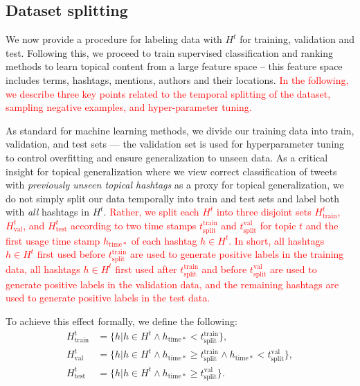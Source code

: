 \subsection*{Dataset splitting}


We now provide a procedure for labeling data with $H^t$ for training, validation and test.
Following this, we proceed to train supervised classification and ranking methods to learn topical content from a large feature space -- this feature space includes terms, hashtags, mentions, authors and their locations. \textcolor{red}{ In the following, we describe three key points related to the temporal splitting of the dataset, sampling negative examples, and hyper-parameter tuning.}


As standard for machine learning methods, we divide our training data into
train, validation, and test sets --- the validation set is used for hyperparameter tuning to control
overfitting and ensure generalization to unseen data.  
As a critical insight for topical generalization where we view correct classification 
of tweets with \emph{previously unseen topical hashtags} as a proxy for topical generalization, 
we do not simply
split our data temporally into train and test sets and label both with \emph{all} 
hashtags in $H^t$. \textcolor{red}{ Rather,
we split each $H^t$ into three disjoint sets $H^t_\mathrm{train}$, $H^t_\mathrm{val}$, and $H^t_\mathrm{test}$
according to two time stamps $t^\mathrm{train}_\mathrm{split}$ and $t^\mathrm{val}_\mathrm{split}$ for topic $t$ and the first usage time stamp 
$h_\mathrm{time*}$ of each hashtag $h \in H^t$.  In short, all hashtags $h \in H^t$ first used
before $t^\mathrm{train}_\mathrm{split}$ are used to generate positive labels in the training data, all hashtags $h \in H^t$ first used
after $t^\mathrm{train}_\mathrm{split}$ and before $t^\mathrm{val}_\mathrm{split}$ 
are used to generate positive labels in the validation data,  and
the remaining hashtags are used to generate positive labels in the test data.}

\noindent To achieve this effect formally, we define the following:
\begin{align*}
H^t_\mathrm{train} & = \{ h | h \in H^t \land h_\mathrm{time*} <    t^\mathrm{train}_\mathrm{split} \} ,  \\
H^t_\mathrm{val}   & = \{ h | h \in H^t \land h_\mathrm{time*} \geq t^\mathrm{train}_\mathrm{split}  \land h_\mathrm{time*} < t^\mathrm{val}_\mathrm{split} 	 \},  \\
H^t_\mathrm{test}   & = \{ h | h \in H^t \land h_\mathrm{time*} \geq t^\mathrm{val}_\mathrm{split} \} .
\end{align*}


